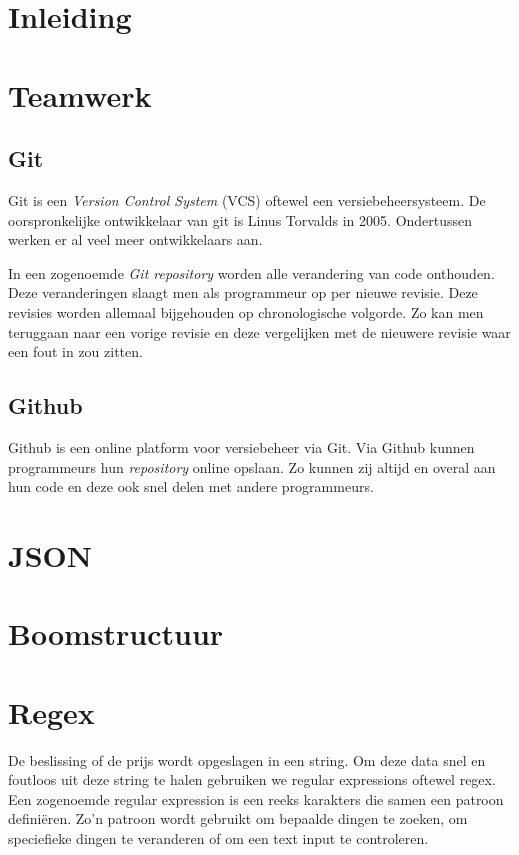 \section{Inleiding}

\section{Teamwerk}
\subsection{Git}
Git is een \textit{Version Control System} (VCS) oftewel een versiebeheersysteem. De oorspronkelijke ontwikkelaar van git is Linus Torvalds in 2005.\cite{init_git} Ondertussen werken er al veel meer ontwikkelaars aan.

In een zogenoemde \textit{Git repository} worden alle verandering van code onthouden. Deze veranderingen slaagt men als programmeur op per nieuwe revisie. Deze revisies worden allemaal bijgehouden op chronologische volgorde. Zo kan men teruggaan naar een vorige revisie en deze vergelijken met de nieuwere revisie waar een fout in zou zitten.
\subsection{Github}
Github is een online platform voor versiebeheer via Git. Via Github kunnen programmeurs hun \textit{repository} online opslaan. Zo kunnen zij altijd en overal aan hun code en deze ook snel delen met andere programmeurs.

\section{JSON}



\section{Boomstructuur}
\section{Regex}
De beslissing of de prijs wordt opgeslagen in een string. Om deze data snel en foutloos uit deze string te halen gebruiken we regular expressions oftewel regex. Een zogenoemde regular expression is een reeks karakters die samen een patroon definiëren. Zo'n patroon wordt gebruikt om bepaalde dingen te zoeken, om speciefieke dingen te veranderen of om een text input te controleren. \cite{wiki:regex}

